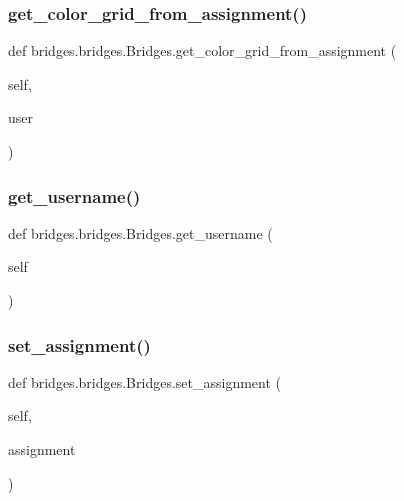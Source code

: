 \subsubsection{\texorpdfstring{get\+\_\+color\+\_\+grid\+\_\+from\+\_\+assignment()}{get\_color\_grid\_from\_assignment()}}
{\footnotesize\ttfamily def bridges.\+bridges.\+Bridges.\+get\+\_\+color\+\_\+grid\+\_\+from\+\_\+assignment (\begin{DoxyParamCaption}\item[{}]{self,  }\item[{}]{user }\end{DoxyParamCaption})}

\mbox{\label{classbridges_1_1bridges_1_1_bridges_abf6fdb19db336c2ed14987fdd89d65fe}} 
\subsubsection{\texorpdfstring{get\+\_\+username()}{get\_username()}}
{\footnotesize\ttfamily def bridges.\+bridges.\+Bridges.\+get\+\_\+username (\begin{DoxyParamCaption}\item[{}]{self }\end{DoxyParamCaption})}

\mbox{\label{classbridges_1_1bridges_1_1_bridges_add46441bec1c93095c48adc724b90e12}} 
\subsubsection{\texorpdfstring{set\+\_\+assignment()}{set\_assignment()}}
{\footnotesize\ttfamily def bridges.\+bridges.\+Bridges.\+set\+\_\+assignment (\begin{DoxyParamCaption}\item[{}]{self,  }\item[{}]{assignment }\end{DoxyParamCaption})}



